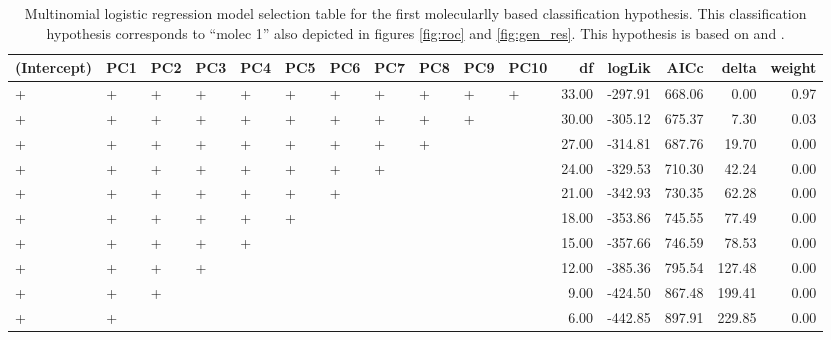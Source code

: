 \documentclass[12pt,letterpaper]{article}\usepackage{graphicx, color}
\begin{document}
\begin{table}
  \centering
{\small
\begin{tabular}{lllllllllllrrrrr}
  \hline
(Intercept) & PC1 & PC2 & PC3 & PC4 & PC5 & PC6 & PC7 & PC8 & PC9 & PC10 & df & logLik & AICc & delta & weight \\ 
  \hline
+ & + & + & + & + & + & + & + & + & + & + & 33.00 & -297.91 & 668.06 & 0.00 & 0.97 \\ 
  + & + & + & + & + & + & + & + & + & + &  & 30.00 & -305.12 & 675.37 & 7.30 & 0.03 \\ 
  + & + & + & + & + & + & + & + & + &  &  & 27.00 & -314.81 & 687.76 & 19.70 & 0.00 \\ 
  + & + & + & + & + & + & + & + &  &  &  & 24.00 & -329.53 & 710.30 & 42.24 & 0.00 \\ 
  + & + & + & + & + & + & + &  &  &  &  & 21.00 & -342.93 & 730.35 & 62.28 & 0.00 \\ 
  + & + & + & + & + & + &  &  &  &  &  & 18.00 & -353.86 & 745.55 & 77.49 & 0.00 \\ 
  + & + & + & + & + &  &  &  &  &  &  & 15.00 & -357.66 & 746.59 & 78.53 & 0.00 \\ 
  + & + & + & + &  &  &  &  &  &  &  & 12.00 & -385.36 & 795.54 & 127.48 & 0.00 \\ 
  + & + & + &  &  &  &  &  &  &  &  & 9.00 & -424.50 & 867.48 & 199.41 & 0.00 \\ 
  + & + &  &  &  &  &  &  &  &  &  & 6.00 & -442.85 & 897.91 & 229.85 & 0.00 \\ 
   \hline
\end{tabular}
}


\caption{Multinomial logistic regression model selection table for the first molecularlly based classification hypothesis. This classification hypothesis corresponds to ``molec 1'' also depicted in figures \ref{fig:roc} and \ref{fig:gen_res}. This hypothesis is based on \citet{Spinks2005} and \citet{Spinks2010}.}
  \label{tab:mod_sel_3}
\end{table}
\end{document}
